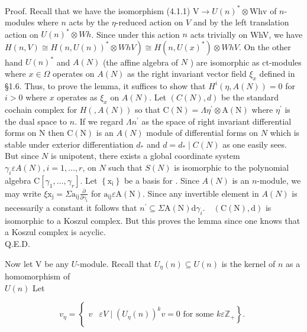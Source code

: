 \documentclass[10pt]{article}
\begin{document}
Proof. Recall that we have the isomorphism (4.1.1) $\mathrm{V} \rightarrow U(n)^{*} \otimes \mathrm{Whv}$ of $n$-modules where $n$ acts by the $\eta$-reduced action on $V$ and by the left translation action on $U(n)^{*} \otimes W h$. Since under this action $n$ acts trivially on WhV, we have $\left.H(n, V) \cong H(n, U(n))^{*} \otimes W h V\right) \cong H\left(n, U(x)^{*}\right) \otimes W h V$. On the other hand $U(n)^{*}$ and $A(N)$ (the affine algebra of $N$ ) are isomorphic as ct-modules\\
where $x \in \Omega$ operates on $A(N)$ as the right invariant vector field $\xi_{x}$ defined in §1.6. Thus, to prove the lemma, it suffices to show that $H^{i}(\eta, A(N))=0$ for $i>0$ where $x$ operates as $\xi_{x}$ on $A(N)$. Let $(C(N), d)$ be the standard cochain complex for $H(, A(N))$ so that $\mathrm{C}(\mathrm{N})=\Lambda \eta^{\prime} \otimes \mathrm{A}(\mathrm{N})$ where $\eta^{\prime}$ is the dual space to $n$. If we regard $\Lambda n^{\prime}$ as the space of right invariant differential forms on N then $\mathrm{C}(\mathrm{N})$ is an $A(N)$ module of differential forms on $N$ which is stable under exterior differentiation $d_{*}$ and $d=d_{*} \mid C(N)$ as one easily sees. But since $N$ is unipotent, there exists a global coordinate system $\gamma_{i} \varepsilon A(N), i=1, \ldots, r$, on $N$ such that $S(N)$ is isomorphic to the polynomial algebra $\mathrm{C}\left[\gamma_{1}, \ldots, \gamma_{r}\right]$. Let $\left\{\mathrm{x}_{\mathrm{i}}\right\}$ be a basis for . Since $A(N)$ is an $n$-module, we may write $\xi \mathrm{x}_{\mathrm{j}}=\Sigma \mathrm{a}_{\mathrm{ij}} \frac{\partial}{\partial \gamma_{\mathrm{i}}}$ for $\mathrm{a}_{\mathrm{ij}} \varepsilon \mathrm{A}(\mathrm{N})$. Since any invertible element in $A(N)$ is necessarily a constant it follows that $n^{\prime} \subseteq \Sigma \mathrm{A}(\mathrm{N}) \mathrm{d} \gamma_{i} . \quad(\mathrm{C}(\mathrm{N}), \mathrm{d})$ is isomorphic to a Koszul complex. But this proves the lemma since one knows that a Koszul complex is acyclic.\\
Q.E.D.

Now let V be any $U$-module. Recall that $U_{\eta}(n) \subseteq U(n)$ is the kernel of $n$ as a homomorphism of\\
$U(n)$ Let


\begin{equation*}
v_{\eta}= \begin{cases}v & \left.\varepsilon V \mid\left(U_{\eta}(n)\right)^{k} v=0 \text { for some } k \varepsilon \mathbb{Z}_{+}\right\} .\end{cases} \tag{4.3.1}
\end{equation*}
\end{document}
